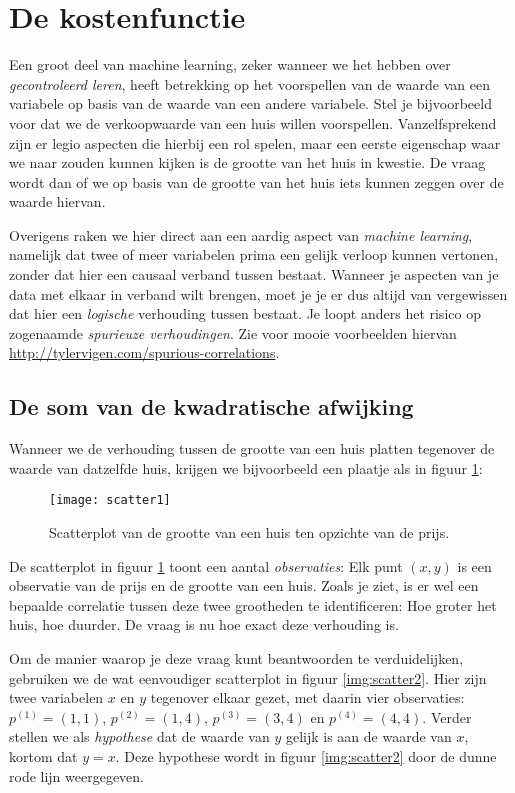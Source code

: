 
\section{De kostenfunctie}

Een groot deel van machine learning, zeker wanneer we het hebben over \textit{gecontroleerd leren}, heeft betrekking op het voorspellen van de waarde van een variabele op basis van de waarde van een andere variabele. Stel je bijvoorbeeld voor dat we de verkoopwaarde van een huis willen voorspellen. Vanzelfsprekend zijn er legio aspecten die hierbij een rol spelen, maar een eerste eigenschap waar we naar zouden kunnen kijken is de grootte van het huis in kwestie. De vraag wordt dan of we op basis van de grootte van het huis iets kunnen zeggen over de waarde hiervan.

Overigens raken we hier direct aan een aardig aspect van \textit{machine learning}, namelijk dat twee of meer variabelen prima een gelijk verloop kunnen vertonen, zonder dat hier een causaal verband tussen bestaat. Wanneer je aspecten van je data met elkaar in verband wilt brengen, moet je je er dus altijd van vergewissen dat hier een \textit{logische} verhouding tussen bestaat. Je loopt anders het risico op zogenaamde \textit{spurieuze verhoudingen}. Zie voor mooie voorbeelden hiervan \url{http://tylervigen.com/spurious-correlations}.

\subsection{De som van de kwadratische afwijking}
Wanneer we de verhouding tussen de grootte van een huis platten tegenover de waarde van datzelfde huis, krijgen we bijvoorbeeld een plaatje als in figuur \ref{img:scatter}:

\begin{figure}[h]
\centering
\texttt{[image: scatter1]}
\caption{Scatterplot van de grootte van een huis ten opzichte van de prijs.\label{img:scatter}}
\end{figure}

De scatterplot in figuur \ref{img:scatter} toont een aantal \textit{observaties}: Elk punt $(x,y)$ is een observatie van de prijs en de grootte van een huis. Zoals je ziet, is er wel een bepaalde correlatie tussen deze twee grootheden te identificeren: Hoe groter het huis, hoe duurder. De vraag is nu hoe exact deze verhouding is.

Om de manier waarop je deze vraag kunt beantwoorden te verduidelijken, gebruiken we de wat eenvoudiger scatterplot in figuur \ref{img:scatter2}. Hier zijn twee variabelen $x$ en $y$ tegenover elkaar gezet, met daarin vier observaties: $p^{(1)}=(1,1)$, $p^{(2)}=(1,4)$, $p^{(3)}=(3,4)$ en $p^{(4)}=(4,4)$. Verder stellen we als \textit{hypothese} dat de waarde van $y$ gelijk is aan de waarde van $x$, kortom dat $y=x$. Deze hypothese wordt in figuur \ref{img:scatter2} door de dunne rode lijn weergegeven.

